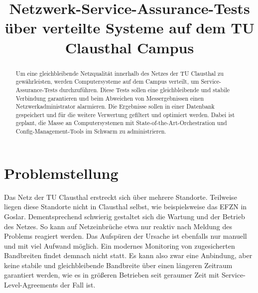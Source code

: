 \documentclass[conference]{IEEEtran}
\begin{document}
\title{Netzwerk-Service-Assurance-Tests über verteilte Systeme auf dem
TU Clausthal Campus}
\author{
}

\maketitle

\begin{abstract}
Um eine gleichbleibende Netzqualität innerhalb des Netzes der
TU Clausthal zu gewährleisten, werden Computersysteme auf dem
Campus verteilt, um Service-Assurance-Tests durchzuführen. Diese
Tests sollen eine gleichbleibende und stabile Verbindung garantieren
und beim Abweichen von Messergebnissen einen Netzwerkadministrator
alarmieren. Die Ergebnisse sollen in einer Datenbank gespeichert und
für die weitere Verwertung gefiltert und optimiert
werden. Dabei ist geplant, die Masse an Computersystemen mit
State-of-the-Art-Orchestration und Config-Management-Tools im
Schwarm zu administrieren.
\end{abstract}

\IEEEpeerreviewmaketitle

\section*{Problemstellung}
Das Netz der TU Clausthal erstreckt sich über mehrere Standorte.
Teilweise liegen diese Standorte nicht in Clausthal selbst, wie
beispielsweise das EFZN in Goslar. Dementsprechend schwierig gestaltet
sich die Wartung und der Betrieb des Netzes. So kann auf Netzeinbrüche
etwa nur reaktiv nach Meldung des Problems reagiert werden. Das
Aufspüren der Ursache ist ebenfalls nur manuell und mit viel Aufwand
möglich. Ein modernes Monitoring von zugesicherten Bandbreiten findet
demnach nicht statt. Es kann also zwar eine Anbindung, aber keine
stabile und gleichbleibende Bandbreite über einen längeren Zeitraum
garantiert werden, wie es in größeren Betrieben seit geraumer Zeit mit
Service-Level-Agreements der Fall ist.
\end{document}
